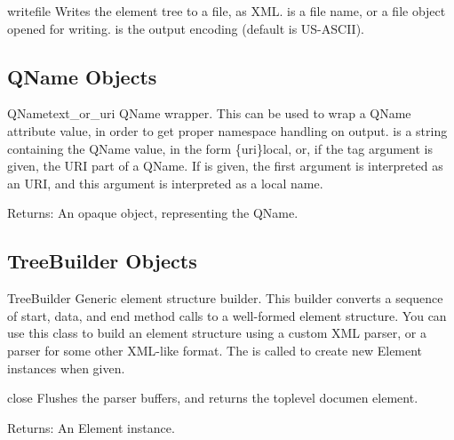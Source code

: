 \begin{methoddesc}{write}{file}
Writes the element tree to a file, as XML.
 is a file name, or a file object opened for writing.
 is the output encoding (default is US-ASCII).
\end{methoddesc}


\subsection{QName Objects\label{elementtree-qname-objects}}

\begin{classdesc}{QName}{text_or_uri}
QName wrapper.  This can be used to wrap a QName attribute value, in
order to get proper namespace handling on output.
 is a string containing the QName value,
in the form {\{}uri{\}}local, or, if the tag argument is given,
the URI part of a QName.
If  is given, the first argument is interpreted as
an URI, and this argument is interpreted as a local name.

\begin{datadescni}{Returns:}
An opaque object, representing the QName.
\end{datadescni}
\end{classdesc}


\subsection{TreeBuilder Objects\label{elementtree-treebuilder-objects}}

\begin{classdesc}{TreeBuilder}{}
Generic element structure builder.  This builder converts a sequence
of start, data, and end method calls to a well-formed element structure.
You can use this class to build an element structure using a custom XML
parser, or a parser for some other XML-like format.
The  is called to create new Element instances when
given.
\end{classdesc}

\begin{methoddesc}{close}{}
Flushes the parser buffers, and returns the toplevel documen
element.

\begin{datadescni}{Returns:}
An Element instance.
\end{datadescni}
\end{methoddesc}

